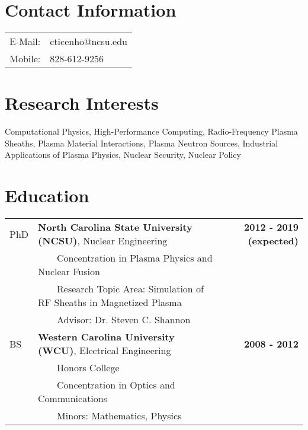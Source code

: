 \documentclass{article}
\title{\vspace{-2.5em}{\huge \textbf{Casey Icenhour}}\vspace{-3em}}
\date{} %
\newcommand{\tabitem}{~~\textbullet~~}
\begin{document}
	
\maketitle

\section*{Contact Information}

\begin{tabularx}{\textwidth}{r l}
	\hspace{3em} E-Mail:  & \hspace{2em} cticenho@ncsu.edu \\
	\hspace{3em} Mobile: & \hspace{2em} 828-612-9256
\end{tabularx}

\section*{Research Interests}

\hspace{0.07\textwidth} \begin{minipage}[t][2em][s]{0.92\textwidth}
	Computational Physics, High-Performance Computing, Radio-Frequency Plasma Sheaths, Plasma Material Interactions, Plasma Neutron Sources, Industrial Applications of Plasma Physics, Nuclear Security, Nuclear Policy
\end{minipage}

\section*{Education}

	\begin{tabularx}{\textwidth}{l X r}
	PhD 		 & \textbf{North Carolina State University (NCSU)}, Nuclear Engineering &  \textbf{2012 - 2019 (expected)} \\
				 & \tabitem Concentration in Plasma Physics and Nuclear Fusion & \\
				 & \tabitem Research Topic Area: Simulation of RF Sheaths in Magnetized Plasma & \\
				 & \tabitem Advisor: Dr. Steven C. Shannon & \\
	BS			 & \textbf{Western Carolina University (WCU)}, Electrical Engineering  & \textbf{2008 - 2012} \\
				 & \tabitem Honors College & \\
				 & \tabitem Concentration in Optics and Communications & \\
				 & \tabitem Minors: Mathematics, Physics &
	\end{tabularx}
\end{document}
